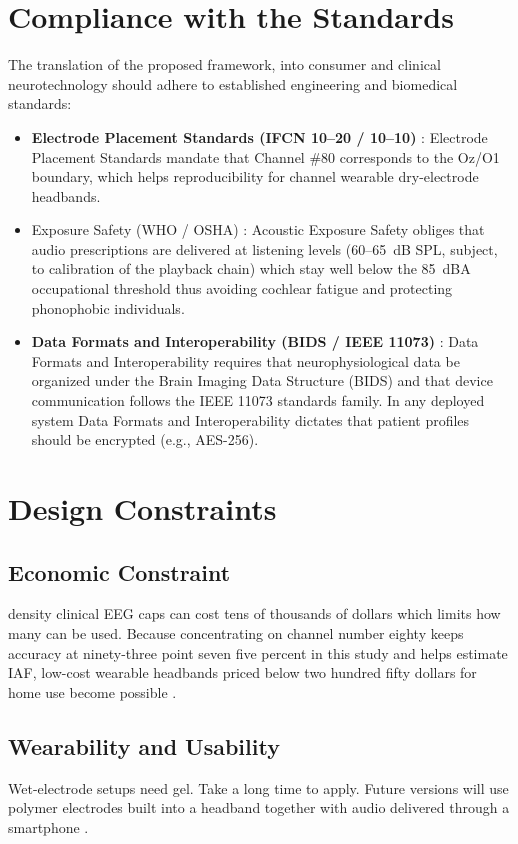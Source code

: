 \documentclass[12pt, a4paper]{report}
\begin{document}
\section{Compliance with the Standards}
\label{sec:standards_compliance}
The translation of the proposed framework, into consumer and clinical neurotechnology should adhere to established engineering and biomedical standards:
\begin{itemize}
    \item \textbf{Electrode Placement Standards (IFCN 10--20 / 10--10)} \cite{Klem1999}: Electrode Placement Standards mandate that Channel \#80 corresponds to the Oz/O1 boundary, which helps reproducibility for channel wearable dry-electrode headbands.
    \item Exposure Safety (WHO / OSHA) \cite{He2023}: Acoustic Exposure Safety obliges that audio prescriptions are delivered at listening levels (60--65~dB SPL, subject, to calibration of the playback chain) which stay well below the 85~dBA occupational threshold thus avoiding cochlear fatigue and protecting phonophobic individuals.
    \item \textbf{Data Formats and Interoperability (BIDS / IEEE 11073)} \cite{Muhammad2023,Petrusic2025}: Data Formats and Interoperability requires that neurophysiological data be organized under the Brain Imaging Data Structure (BIDS) and that device communication follows the IEEE 11073 standards family. In any deployed system Data Formats and Interoperability dictates that patient profiles should be encrypted (e.g., AES-256).
\end{itemize}

\section{Design Constraints}
\label{sec:realistic_considerations}

    \subsection{Economic Constraint}
    density clinical EEG caps can cost tens of thousands of dollars which limits how many can be used. Because concentrating on channel number eighty keeps accuracy at ninety-three point seven five percent in this study and helps estimate IAF, low-cost wearable headbands priced below two hundred fifty dollars for home use become possible \cite{Muhammad2023}.
    \subsection{Wearability and Usability}
    Wet-electrode setups need gel. Take a long time to apply. Future versions will use polymer electrodes built into a headband together with audio delivered through a smartphone \cite{Petrusic2025,He2023}.
\end{document}

